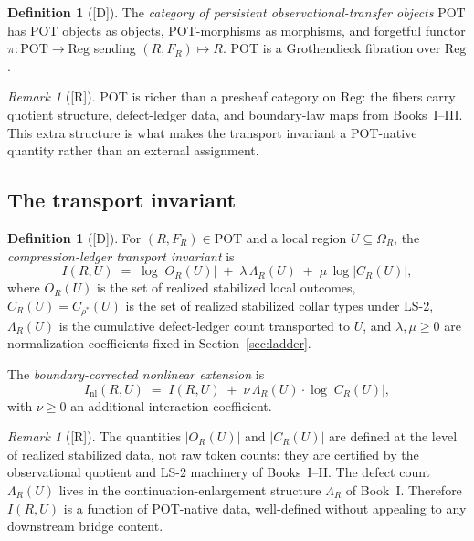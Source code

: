 \documentclass[12pt,oneside]{amsbook}
\theoremstyle{plain}
\theoremstyle{definition}
\newtheorem{definition}[theorem]{Definition}
\theoremstyle{remark}
\newtheorem{remark}[theorem]{Remark}
\newcommand{\status}[1]{\textup{[#1]}}
\begin{document}
\begin{definition}[\status{D}]\label{def:POT-category}
The \emph{category of persistent observational-transfer objects}
$\mathrm{POT}$ has POT objects as objects, POT-morphisms as morphisms,
and forgetful functor $\pi: \mathrm{POT} \to \mathrm{Reg}$ sending
$(R, F_R) \mapsto R$.  $\mathrm{POT}$ is a Grothendieck fibration over
$\mathrm{Reg}$.
\end{definition}

\begin{remark}[\status{R}]\label{rmk:POT-not-presheaf}
POT is richer than a presheaf category on $\mathrm{Reg}$: the fibers
carry quotient structure, defect-ledger data, and boundary-law maps
from Books~I--III.  This extra structure is what makes the transport
invariant a POT-native quantity rather than an external assignment.
\end{remark}

\subsection*{The transport invariant}

\begin{definition}[\status{D}]\label{def:transport-invariant}
For $(R, F_R) \in \mathrm{POT}$ and a local region $U \subseteq
\Omega_R$, the \emph{compression-ledger transport invariant} is
\[
  I(R, U) \;=\; \log|O_R(U)| \;+\; \lambda\,\Lambda_R(U)
            \;+\; \mu\,\log|C_R(U)|,
\]
where $O_R(U)$ is the set of realized stabilized local outcomes,
$C_R(U) = C_{\rho^*}(U)$ is the set of realized stabilized collar
types under LS-2, $\Lambda_R(U)$ is the cumulative defect-ledger count
transported to $U$, and $\lambda, \mu \geq 0$ are normalization
coefficients fixed in Section~\ref{sec:ladder}.

The \emph{boundary-corrected nonlinear extension} is
\[
  I_{\mathrm{nl}}(R, U)
  \;=\; I(R,U) \;+\; \nu\,\Lambda_R(U) \cdot \log|C_R(U)|,
\]
with $\nu \geq 0$ an additional interaction coefficient.
\end{definition}

\begin{remark}[\status{R}]\label{rmk:invariant-POT-native}
The quantities $|O_R(U)|$ and $|C_R(U)|$ are defined at the level of
realized stabilized data, not raw token counts: they are certified by
the observational quotient and LS-2 machinery of Books~I--II.  The
defect count $\Lambda_R(U)$ lives in the continuation-enlargement
structure $\Lambda_R$ of Book~I.  Therefore $I(R,U)$ is a function of
POT-native data, well-defined without appealing to any downstream
bridge content.
\end{remark}
\end{document}
